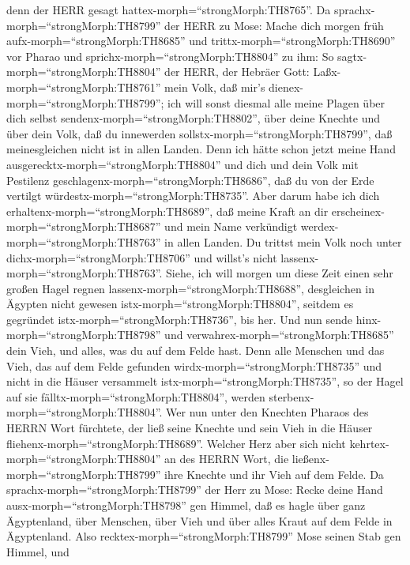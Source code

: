 denn der HERR gesagt hattex-morph=``strongMorph:TH8765''. 
Da sprachx-morph=``strongMorph:TH8799'' der HERR zu Mose: Mache dich
morgen früh aufx-morph=``strongMorph:TH8685'' und
trittx-morph=``strongMorph:TH8690'' vor Pharao und
sprichx-morph=``strongMorph:TH8804'' zu ihm: So
sagtx-morph=``strongMorph:TH8804'' der HERR, der Hebräer Gott:
Laßx-morph=``strongMorph:TH8761'' mein Volk, daß mir's
dienex-morph=``strongMorph:TH8799'';  ich will sonst
diesmal alle meine Plagen über dich selbst
sendenx-morph=``strongMorph:TH8802'', über deine Knechte und über dein
Volk, daß du innewerden sollstx-morph=``strongMorph:TH8799'', daß
meinesgleichen nicht ist in allen Landen.  Denn ich hätte
schon jetzt meine Hand ausgerecktx-morph=``strongMorph:TH8804'' und dich
und dein Volk mit Pestilenz geschlagenx-morph=``strongMorph:TH8686'',
daß du von der Erde vertilgt würdestx-morph=``strongMorph:TH8735''.
 Aber darum habe ich dich
erhaltenx-morph=``strongMorph:TH8689'', daß meine Kraft an dir
erscheinex-morph=``strongMorph:TH8687'' und mein Name verkündigt
werdex-morph=``strongMorph:TH8763'' in allen Landen.  Du
trittst mein Volk noch unter dichx-morph=``strongMorph:TH8706'' und
willst's nicht lassenx-morph=``strongMorph:TH8763''. 
Siehe, ich will morgen um diese Zeit einen sehr großen Hagel regnen
lassenx-morph=``strongMorph:TH8688'', desgleichen in Ägypten nicht
gewesen istx-morph=``strongMorph:TH8804'', seitdem es gegründet
istx-morph=``strongMorph:TH8736'', bis her.  Und nun sende
hinx-morph=``strongMorph:TH8798'' und
verwahrex-morph=``strongMorph:TH8685'' dein Vieh, und alles, was du auf
dem Felde hast. Denn alle Menschen und das Vieh, das auf dem Felde
gefunden wirdx-morph=``strongMorph:TH8735'' und nicht in die Häuser
versammelt istx-morph=``strongMorph:TH8735'', so der Hagel auf sie
fälltx-morph=``strongMorph:TH8804'', werden
sterbenx-morph=``strongMorph:TH8804''.  Wer nun unter den
Knechten Pharaos des HERRN Wort fürchtete, der ließ seine Knechte und
sein Vieh in die Häuser fliehenx-morph=``strongMorph:TH8689''.
 Welcher Herz aber sich nicht
kehrtex-morph=``strongMorph:TH8804'' an des HERRN Wort, die
ließenx-morph=``strongMorph:TH8799'' ihre Knechte und ihr Vieh auf dem
Felde.  Da sprachx-morph=``strongMorph:TH8799'' der Herr zu
Mose: Recke deine Hand ausx-morph=``strongMorph:TH8798'' gen Himmel, daß
es hagle über ganz Ägyptenland, über Menschen, über Vieh und über alles
Kraut auf dem Felde in Ägyptenland.  Also
recktex-morph=``strongMorph:TH8799'' Mose seinen Stab gen Himmel, und
